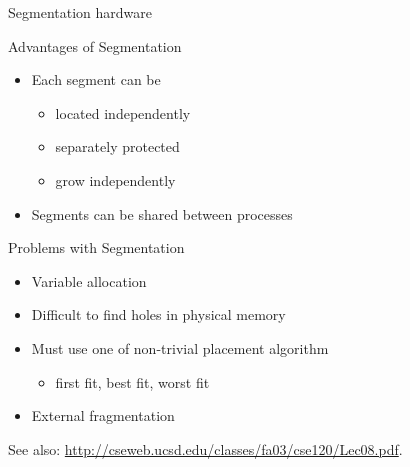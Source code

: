 \begin{frame}{Segmentation hardware}
  \begin{center}
    \label{fig:segmentation-hardware}
  \end{center}
\end{frame}

\begin{frame}
  \begin{center}
  \end{center}
\end{frame}

\begin{frame}
  \begin{iblock}{Advantages of Segmentation}
    \begin{itemize}
    \item Each segment can be
      \begin{itemize}
      \item located independently
      \item separately protected
      \item grow independently
      \end{itemize}
    \item Segments can be shared between processes
    \end{itemize}
  \end{iblock}
  \begin{iblock}{Problems with Segmentation}
    \begin{itemize}
    \item Variable allocation
    \item Difficult to find holes in physical memory
    \item Must use one of non-trivial placement algorithm
      \begin{itemize}
      \item first fit, best fit, worst fit
      \end{itemize}
    \item External fragmentation
    \end{itemize}
  \end{iblock}
\end{frame}

See also: \url{http://cseweb.ucsd.edu/classes/fa03/cse120/Lec08.pdf}.

